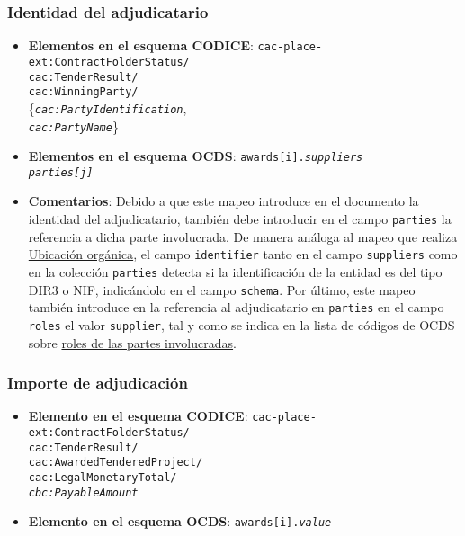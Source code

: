         \subsubsection{Identidad del adjudicatario}
            \begin{itemize}
                \item \textbf{Elementos en el esquema CODICE}:
                    \tabto{7.6cm} \texttt{cac-place-ext:ContractFolderStatus/} \\
                    \tabto{7.6cm} \texttt{cac:TenderResult/} \\
                    \tabto{7.6cm} \texttt{cac:WinningParty/} \\
                    \tabto{7.7cm} \{\texttt{\textit{cac:PartyIdentification}}, \\
                    \tabto{7.7cm} \texttt{\textit{cac:PartyName}}\}
                \item \textbf{Elementos en el esquema OCDS}:
                    \tabto{7.6cm} \texttt{awards[i].\textit{suppliers}} \\
                    \tabto{7.6cm} \texttt{\textit{parties[j]}}
                \item \textbf{Comentarios}: Debido a que este mapeo introduce en el documento la identidad del adjudicatario, también debe introducir en el campo \texttt{parties} la referencia a dicha parte involucrada. De manera análoga al mapeo que realiza  \hyperref[subsec:UbicacionOrganica]{Ubicación orgánica}, el campo \texttt{identifier} tanto en el campo \texttt{suppliers} como en la colección \texttt{parties} detecta si la identificación de la entidad es del tipo DIR3 o NIF, indicándolo en el campo \texttt{schema}. Por último, este mapeo también introduce en la referencia al adjudicatario en \texttt{parties} en el campo \texttt{roles} el valor \texttt{supplier}, tal y como se indica en la lista de códigos de OCDS sobre \href{https://standard.open-contracting.org/latest/en/schema/codelists/#party-role}{roles de las partes involucradas}.
            \end{itemize}
            
        \subsubsection{Importe de adjudicación}
            \begin{itemize}
                \item \textbf{Elemento en el esquema CODICE}:
                    \tabto{7.6cm} \texttt{cac-place-ext:ContractFolderStatus/} \\
                    \tabto{7.6cm} \texttt{cac:TenderResult/} \\
                    \tabto{7.6cm} \texttt{cac:AwardedTenderedProject/} \\
                    \tabto{7.6cm} \texttt{cac:LegalMonetaryTotal/} \\
                    \tabto{7.6cm} \texttt{\textit{cbc:PayableAmount}}
                \item \textbf{Elemento en el esquema OCDS}:
                    \tabto{7.6cm} \texttt{awards[i].\textit{value}}
            \end{itemize}
            
